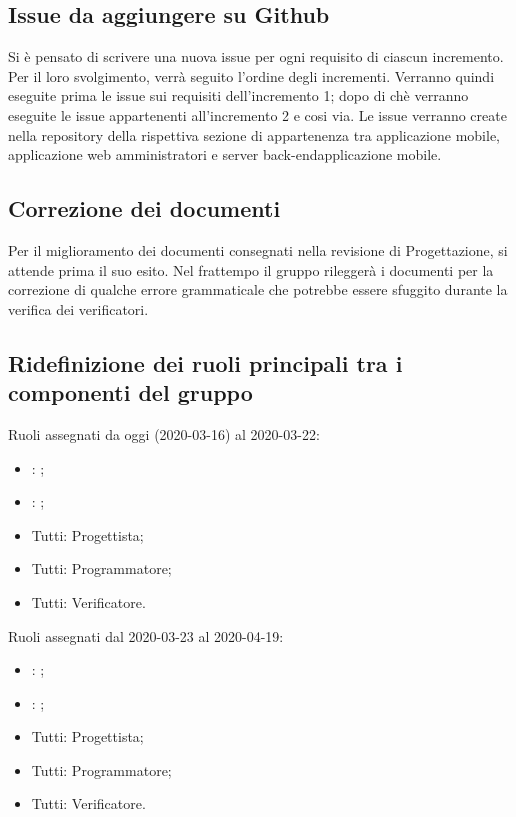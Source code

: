 \subsection{Issue da aggiungere su Github}
Si è pensato di scrivere una nuova issue per ogni requisito di ciascun incremento. Per il loro svolgimento, verrà seguito l'ordine degli incrementi. Verranno quindi eseguite prima le issue sui requisiti dell'incremento 1; dopo di chè verranno eseguite le issue appartenenti all'incremento 2 e cosi via.
Le issue verranno create nella repository della rispettiva sezione di appartenenza tra applicazione mobile, applicazione web amministratori e server back-endapplicazione mobile.

\subsection{Correzione dei documenti}
Per il miglioramento dei documenti consegnati nella revisione di Progettazione, si attende prima il suo esito.
Nel frattempo il gruppo rileggerà i documenti per la correzione di qualche errore grammaticale che potrebbe essere sfuggito durante la verifica dei verificatori.

\subsection{Ridefinizione dei ruoli principali tra i componenti del gruppo}
Ruoli assegnati da oggi (2020-03-16) al 2020-03-22:
\begin{itemize}
	\item \DF{}: \Responsabile{};
	\item \PF{}: \Amministratore{};
	\item Tutti: Progettista; 
	\item Tutti: Programmatore;
	\item Tutti: Verificatore.
\end{itemize}

Ruoli assegnati dal 2020-03-23 al 2020-04-19:
\begin{itemize}
	\item \AT{}: \Responsabile{}; 
	\item \MC{}: \Amministratore{};
	\item Tutti: Progettista; 
	\item Tutti: Programmatore;
	\item Tutti: Verificatore.
\end{itemize}


\clearpage